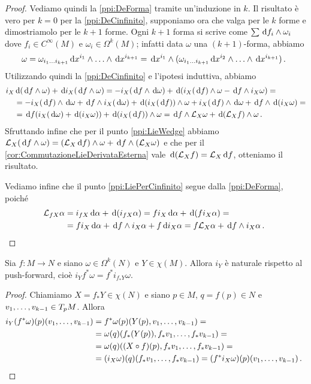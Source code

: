 \begin{proof}
	Vediamo quindi la \ref{ppi:DeForma} tramite un'induzione in $k$. Il risultato è vero per $k=0$ per la \ref{ppi:DeCinfinito}, supponiamo ora che valga per le $k$ forme e dimostriamolo per le $k+1$ forme. Ogni $k+1$ forma si scrive come $\sum \de f_i \wedge \omega_i$ dove $f_i \in C^\infty(M)$ e $\omega_i\in\Omega^k(M)$; infatti data $\omega$ una $(k+1)$-forma, abbiamo
	\begin{equation*}
	\omega = \omega_{\seqb i{k+1}{}} \de x^{i_1} \wedge \ldots \wedge \de x^{i_{k+1}} = \de x^{i_1} \wedge (\omega_{\seqb i{k+1}{}} \de x^{i_2} \wedge \ldots \wedge \de x^{i_{k+1}}) \punto
	\end{equation*}
	Utilizzando quindi la \ref{ppi:DeCinfinito} e l'ipotesi induttiva, abbiamo
	\begin{align*}
	i_X & \de (\de f  \wedge  \omega) + \de i_X(\de f \wedge \omega) = -i_X(\de f\wedge \de \omega) + \de (i_X(\de f) \wedge \omega - \de f \wedge i_X\omega) =\\
	&= -i_X(\de f)\wedge \de \omega + \de f\wedge i_X (\de \omega) + \de (i_X (\de f)) \wedge \omega + i_X (\de f) \wedge \de \omega + \de f \wedge \de (i_X \omega) =\\
	&= \de f(i_X(\de\omega) + \de (i_X\omega)) + \de(i_X(\de f)) \wedge \omega=\de f \wedge \Lie_X\omega + \de (\Lie_Xf) \wedge \omega \punto
	\end{align*}
	Sfruttando infine che per il punto \ref{ppi:LieWedge} abbiamo $\Lie_X(\de f\wedge\omega) = (\Lie_X\de f)\wedge \omega + \de f \wedge (\Lie_X\omega)$ e che per il \cref{cor:CommutazioneLieDerivataEsterna} vale $\de(\Lie_Xf) = \Lie_X \de f$, otteniamo il risultato.
	
	Vediamo infine che il punto \ref{ppi:LiePerCinfinito} segue dalla \ref{ppi:DeForma}, poiché
	\begin{align*}
	\Lie_{fX}\alpha &= i_{fX} \de \alpha + \de (i_{fX} \alpha) = f i_X \de \alpha + \de (fi_X\alpha) =\\
	&=f i_X\de \alpha + \de f \wedge i_X\alpha + f \de i_X\alpha = f\Lie_X \alpha + \de f \wedge i_X\alpha \punto
	\end{align*}
\end{proof}

\begin{proposition}
	Sia $f:M\to N$ e siano $\omega \in \Omega^k(N)$ e $Y \in \chi(M)$. Allora $i_Y$ è naturale rispetto al push-forward, cioè $i_Yf^*\omega = f^* i_{f_*Y}\omega$.
\end{proposition}
\begin{proof}
	Chiamiamo $X = f_*Y \in \chi(N)$ e siano $p\in M$, $q=f(p)\in N$ e $\seqb v{k-1}, \in T_pM$. Allora
	\begin{align*}
		i_Y(f^*\omega)(p)(\seqb v{k-1},) &= f^* \omega (p) (Y(p), \seqb v{k-1},) =\\
		&=\omega(q) (f_*(Y(p)), f_*v_1,\ldots, f_*v_{k-1}) = \\
		&= \omega(q)((X\circ f)(p),f_*v_1,\ldots, f_*v_{k-1}) =\\
		&=(i_X\omega)(q) (f_*v_1,\ldots, f_*v_{k-1})  =(f^*i_X\omega) (p) (\seqb v{k-1},) \punto 
	\end{align*}
\end{proof}


